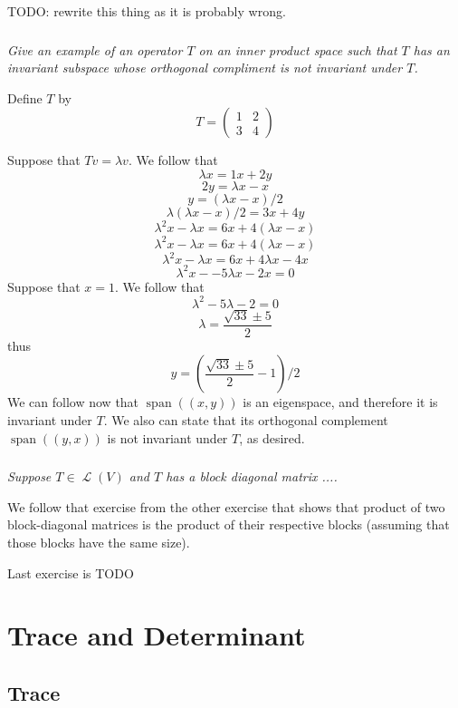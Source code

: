 \documentclass[11pt,oneside,titlepage]{book}
\DeclareMathOperator \map {\mathcal {L}}
\DeclareMathOperator \Span {span}
\begin{document}
TODO: rewrite this thing as it is probably wrong.

\subsection{}

\textit{Give an example of an operator $T$ on an inner product space such that $T$
  has an invariant subspace whose orthogonal compliment is not invariant under $T$.}

Define $T$ by
$$T =
\begin{pmatrix}
  1 & 2 \\
  3 & 4
\end{pmatrix}
$$

Suppose that $Tv = \lambda v$. We follow that
$$\lambda x = 1 x + 2 y$$
$$ 2 y = \lambda x - x$$
$$ y = (\lambda x - x) / 2$$
$$\lambda (\lambda x - x) / 2 = 3 x + 4 y$$
$$\lambda^2 x - \lambda x = 6 x + 4 (\lambda x - x)$$
$$\lambda^2 x - \lambda x = 6 x + 4 (\lambda x - x)$$
$$\lambda^2 x - \lambda x = 6 x + 4 \lambda x - 4x$$
$$\lambda^2 x - -5\lambda x - 2x = 0$$
Suppose that $x = 1$. We follow that
$$\lambda^2  -5\lambda  - 2 = 0$$
$$\lambda = \frac{\sqrt{33} \pm 5}{2}$$
thus
$$y = (\frac{\sqrt{33} \pm 5}{2} - 1)/2$$
We can follow now that $\Span((x, y))$ is an eigenspace, and therefore it is
invariant under $T$. We also can state that its orthogonal complement $\Span((y, x))$
is not invariant under $T$, as desired.

\subsection{}

\textit{Suppose $T \in \map(V)$ and $T$ has a block diagonal matrix
  ....}

We follow that exercise from the other exercise that shows that product
of two block-diagonal matrices is the product of their respective blocks (assuming
that those blocks have the same size).

Last exercise is TODO

\chapter{Trace and Determinant}

\section{Trace}
\end{document}
